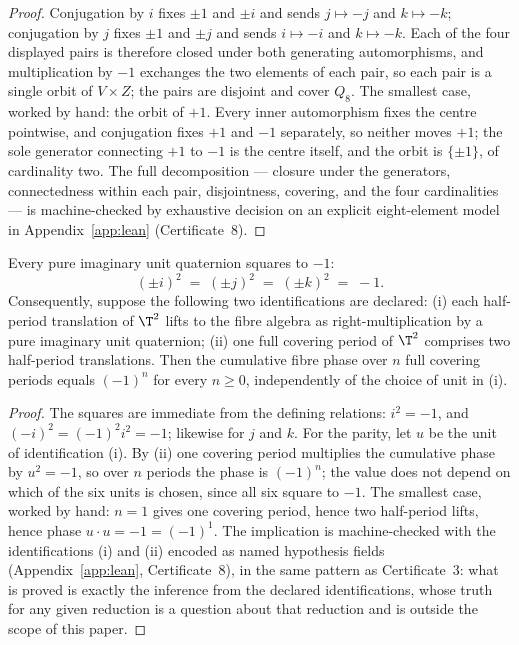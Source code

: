 \begin{proof}
Conjugation by $i$ fixes $\pm 1$ and $\pm i$ and sends
$j \mapsto -j$ and $k \mapsto -k$; conjugation by $j$ fixes
$\pm 1$ and $\pm j$ and sends $i \mapsto -i$ and $k \mapsto -k$.
Each of the four displayed pairs is therefore closed under both
generating automorphisms, and multiplication by $-1$ exchanges the
two elements of each pair, so each pair is a single orbit of
$V \times Z$; the pairs are disjoint and cover $Q_8$. The smallest
case, worked by hand: the orbit of $+1$. Every inner automorphism
fixes the centre pointwise, and conjugation fixes $+1$ and $-1$
separately, so neither moves $+1$; the sole generator connecting
$+1$ to $-1$ is the centre itself, and the orbit is $\{\pm 1\}$, of
cardinality two. The full decomposition --- closure under the
generators, connectedness within each pair, disjointness, covering,
and the four cardinalities --- is machine-checked by exhaustive
decision on an explicit eight-element model in
Appendix~\ref{app:lean} (Certificate~8).
\end{proof}

\begin{proposition}\label{prop:parity}
Every pure imaginary unit quaternion squares to $-1$:
\[
(\pm i)^2 \;=\; (\pm j)^2 \;=\; (\pm k)^2 \;=\; -1 .
\]
Consequently, suppose the following two identifications are
declared: \textup{(i)} each half-period translation of $\T^2$ lifts
to the fibre algebra as right-multiplication by a pure imaginary
unit quaternion; \textup{(ii)} one full covering period of $\T^2$
comprises two half-period translations. Then the cumulative fibre
phase over $n$ full covering periods equals $(-1)^n$ for every
$n \ge 0$, independently of the choice of unit in \textup{(i)}.
\end{proposition}

\begin{proof}
The squares are immediate from the defining relations: $i^2 = -1$,
and $(-i)^2 = (-1)^2 i^2 = -1$; likewise for $j$ and $k$. For the
parity, let $u$ be the unit of identification (i). By (ii) one
covering period multiplies the cumulative phase by $u^2 = -1$, so
over $n$ periods the phase is $(-1)^n$; the value does not depend on
which of the six units is chosen, since all six square to $-1$. The
smallest case, worked by hand: $n = 1$ gives one covering period,
hence two half-period lifts, hence phase $u \cdot u = -1 = (-1)^1$.
The implication is machine-checked with the identifications (i)
and (ii) encoded as named hypothesis fields
(Appendix~\ref{app:lean}, Certificate~8), in the same pattern as
Certificate~3: what is proved is exactly the inference from the
declared identifications, whose truth for any given reduction is a
question about that reduction and is outside the scope of this
paper.
\end{proof}

